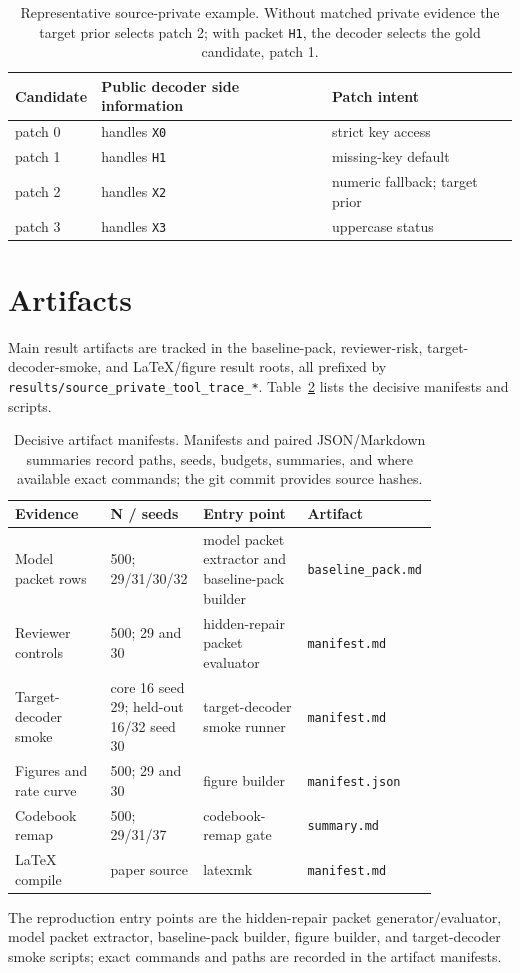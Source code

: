 \documentclass{article}
\begin{document}
\begin{table}[t]
\centering
\small
\begin{tabular}{lll}
\toprule
Candidate & Public decoder side information & Patch intent \\
\midrule
patch 0 & handles \texttt{X0} & strict key access \\
patch 1 & handles \texttt{H1} & missing-key default \\
patch 2 & handles \texttt{X2} & numeric fallback; target prior \\
patch 3 & handles \texttt{X3} & uppercase status \\
\bottomrule
\end{tabular}
\caption{Representative source-private example. Without matched private
evidence the target prior selects patch 2; with packet \texttt{H1}, the decoder
selects the gold candidate, patch 1.}
\label{tab:example}
\end{table}

\section{Artifacts}

Main result artifacts are tracked in the baseline-pack, reviewer-risk,
target-decoder-smoke, and LaTeX/figure result roots, all prefixed by
\texttt{results/source\_private\_tool\_trace\_*}. Table~\ref{tab:artifacts}
lists the decisive manifests and scripts.

\begin{table}[t]
\centering
\scriptsize
\setlength{\tabcolsep}{2pt}
\begin{tabular}{p{0.22\linewidth}p{0.16\linewidth}p{0.24\linewidth}p{0.22\linewidth}}
\toprule
Evidence & N / seeds & Entry point & Artifact \\
\midrule
Model packet rows & 500; 29/31/30/32 & model packet extractor and baseline-pack builder & \texttt{baseline\_pack.md} \\
Reviewer controls & 500; 29 and 30 & hidden-repair packet evaluator & \texttt{manifest.md} \\
Target-decoder smoke & core 16 seed 29; held-out 16/32 seed 30 & target-decoder smoke runner & \texttt{manifest.md} \\
Figures and rate curve & 500; 29 and 30 & figure builder & \texttt{manifest.json} \\
Codebook remap & 500; 29/31/37 & codebook-remap gate & \texttt{summary.md} \\
LaTeX compile & paper source & latexmk & \texttt{manifest.md} \\
\bottomrule
\end{tabular}
\caption{Decisive artifact manifests. Manifests and paired JSON/Markdown
summaries record paths, seeds, budgets, summaries, and where available exact
commands; the git commit provides source hashes.}
\label{tab:artifacts}
\end{table}

The reproduction entry points are the hidden-repair packet generator/evaluator,
model packet extractor, baseline-pack builder, figure builder, and
target-decoder smoke scripts; exact commands and paths are recorded in the
artifact manifests.
\end{document}
